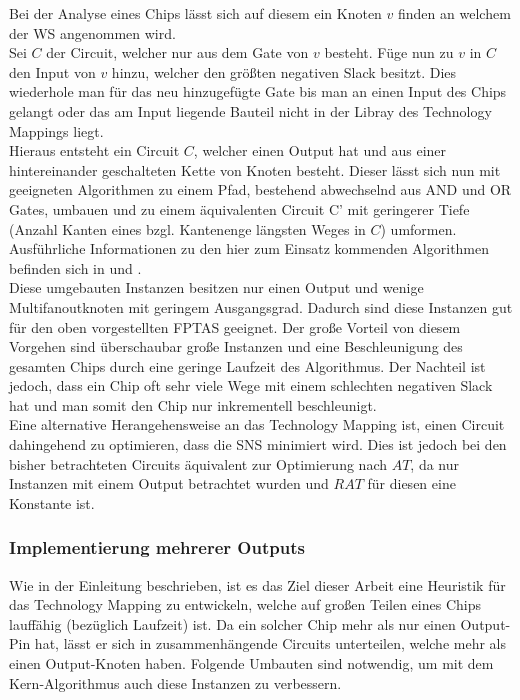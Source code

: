 \documentclass[11pt, a4paper, german]{article}
\newcommand{\TM}{Technology  Mapping }
\begin{document}
Bei der Analyse eines Chips lässt sich auf diesem ein Knoten $v$ finden an welchem der WS angenommen wird.\\
Sei $C$ der Circuit, welcher nur aus dem Gate von $v$ besteht. Füge nun zu $v$ in $C$ den Input von $v$ hinzu, welcher den größten negativen Slack besitzt. Dies wiederhole man für das neu hinzugefügte Gate bis man an einen Input des Chips gelangt oder das am Input liegende Bauteil nicht in der Libray des Technology Mappings liegt. \\
Hieraus entsteht ein Circuit $C$, welcher einen Output hat und aus einer hintereinander geschalteten Kette von Knoten besteht. Dieser lässt sich nun mit geeigneten Algorithmen zu einem Pfad, bestehend abwechselnd aus AND und OR Gates,  umbauen und  zu einem äquivalenten Circuit C' mit geringerer Tiefe (Anzahl Kanten eines bzgl. Kantenenge längsten  Weges in $C$) umformen. Ausführliche Informationen zu den hier zum Einsatz kommenden Algorithmen befinden sich in \cite{Werber} und \cite{Hermann}.\\

Diese umgebauten Instanzen besitzen nur einen Output und wenige Multifanoutknoten mit geringem Ausgangsgrad. Dadurch sind diese Instanzen gut für den oben vorgestellten FPTAS geeignet. Der große Vorteil von diesem Vorgehen sind überschaubar große Instanzen und eine Beschleunigung des gesamten Chips durch eine geringe Laufzeit des Algorithmus. Der Nachteil ist jedoch, dass ein Chip oft sehr viele Wege mit einem schlechten negativen Slack hat und man somit den Chip nur inkrementell beschleunigt.\\

Eine alternative Herangehensweise an das \TM ist, einen Circuit dahingehend zu optimieren, dass die SNS minimiert wird. Dies ist jedoch bei den bisher betrachteten Circuits äquivalent zur Optimierung nach $AT$, da nur Instanzen mit einem Output betrachtet wurden und $RAT$ für diesen eine Konstante ist.

\subsubsection{Implementierung mehrerer Outputs}
\label{subsec:mehrere_outputs}
Wie in der Einleitung beschrieben, ist es das Ziel dieser Arbeit eine Heuristik für das \TM zu entwickeln, welche auf großen Teilen eines Chips lauffähig (bezüglich Laufzeit) ist. Da ein solcher Chip mehr als nur einen Output-Pin hat, lässt er sich in zusammenhängende Circuits unterteilen, welche mehr als einen Output-Knoten haben. Folgende Umbauten sind notwendig, um mit dem Kern-Algorithmus auch diese Instanzen zu verbessern.\\
\end{document}
